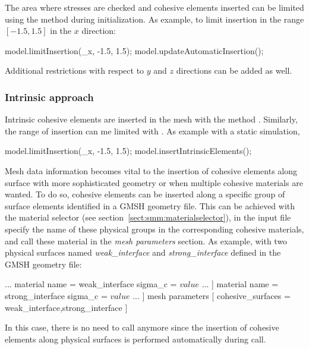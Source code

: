 The area where stresses are checked and cohesive elements inserted can
be limited using the method  during
initialization. As example, to limit insertion in the range $[-1.5,
1.5]$ in the $x$ direction:
\begin{cpp}
  model.limitInsertion(_x, -1.5, 1.5);
  model.updateAutomaticInsertion();
\end{cpp} 
Additional restrictions with respect to $y$ and $z$ directions can be added as well.

\subsubsection{Intrinsic approach \label{intrinsic_insertion}}
Intrinsic cohesive elements are inserted in the mesh with the method
. Similarly, the range of insertion can me limited 
with . As example with a static simulation,
\begin{cpp}
  model.limitInsertion(_x, -1.5, 1.5);
  model.insertIntrinsicElements();
\end{cpp} 
Mesh data information becomes vital to the insertion of cohesive
elements along surface with more sophisticated geometry or when
multiple cohesive materials are wanted. To do so, cohesive elements
can be inserted along a specific group of surface elements identified
in a GMSH geometry file. This can be achieved with the material
selector (see section~\ref{sect:smm:materialselector}), in the input
file specify the name of these physical groups in the corresponding
cohesive materials, and call these material in the \textit{mesh
parameters} section. As example, with two physical surfaces named
\textit{weak\_interface} and \textit{strong\_interface} defined in the GMSH 
geometry file:
\begin{cpp}
...
  material %
     name = weak_interface
     sigma_c = $value$
     ...
  ]
  material %
     name = strong_interface
     sigma_c = $value$
     ...
  ]
  mesh parameters [
     	cohesive_surfaces = weak_interface,strong_interface
  ]
\end{cpp}

In this case, there is no need to call  anymore 
since the insertion of cohesive elements along physical surfaces is performed 
automatically during  call.    
